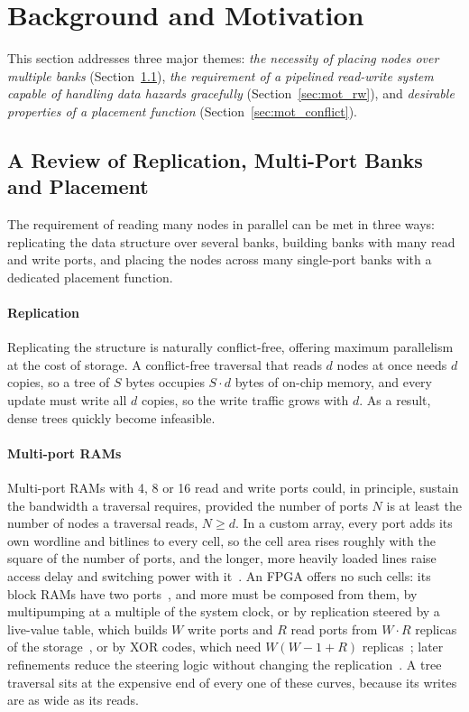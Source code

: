 \section{Background and Motivation}\label{sec:motivation}

This section addresses three major themes:
\emph{the necessity of placing nodes over multiple banks}
(Section~\ref{sec:mot_banks}), \emph{the requirement of a pipelined read-write
	system capable of handling data hazards gracefully} (Section~\ref{sec:mot_rw}),
and \emph{desirable properties of a placement function}
(Section~\ref{sec:mot_conflict}).

\subsection{A Review of Replication, Multi-Port Banks and Placement}\label{sec:mot_banks}

The requirement of reading many nodes in parallel can be met in three ways:
replicating the data structure over several banks, building banks with many
read and write ports, and placing the nodes across many single-port banks with
a dedicated placement function.

\paragraph{Replication} Replicating the structure is naturally conflict-free,
offering maximum parallelism at the cost of storage. A conflict-free traversal
that reads $d$ nodes at once needs $d$ copies, so a tree of $S$ bytes occupies
$S \cdot d$ bytes of on-chip memory, and every update must write all $d$
copies, so the write traffic grows with $d$. As a result, dense trees quickly
become infeasible.

\paragraph{Multi-port RAMs} Multi-port RAMs with 4, 8 or 16 read and write
ports could, in principle, sustain the bandwidth a traversal requires, provided
the number of ports $N$ is at least the number of nodes a traversal reads,
$N \ge d$. In a custom array, every port adds its own wordline and bitlines to
every cell, so the cell area rises roughly with the square of the number of
ports, and the longer, more heavily loaded lines raise access delay and
switching power with it~\cite{rixner2000}. An FPGA offers no such cells: its
block RAMs have two ports~\cite{ref2,ref30}, and more must be composed from
them, by multipumping at a multiple of the system clock, or by replication
steered by a live-value table, which builds $W$ write ports and $R$ read ports
from $W \cdot R$ replicas of the storage~\cite{laforest2010,laforest2014}, or
by XOR codes, which need $W(W - 1 + R)$ replicas~\cite{laforest2012}; later
refinements reduce the steering logic without changing the
replication~\cite{abdelhadi2014}. A tree traversal sits at the expensive end of
every one of these curves, because its writes are as wide as its reads.

